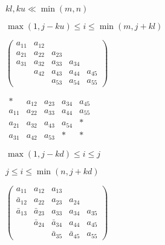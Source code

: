 {\newpage\clearpage
{}%
$kl, ku \ll \min(m,n)$%
\lthtmlinlinemathZ
\lthtmlcheckvsize\clearpage}

{\newpage\clearpage
{}%
$\max(1,j-ku) \leq i \leq \min(m,j+kl)$%
\lthtmlinlinemathZ
\lthtmlcheckvsize\clearpage}

{\newpage\clearpage
{}%
$
\left( \begin{array}{ccccc}
a_{11} & a_{12} &        &        &        \\
a_{21} & a_{22} & a_{23} &        &        \\
a_{31} & a_{32} & a_{33} & a_{34} &        \\
       & a_{42} & a_{43} & a_{44} & a_{45} \\
       &        & a_{53} & a_{54} & a_{55} 
\end{array} \right)
$%
\lthtmlinlinemathZ
\lthtmlcheckvsize\clearpage}

{\newpage\clearpage
{}%
$
\begin{array}{ccccc}
 \ast  & a_{12} & a_{23} & a_{34} & a_{45} \\
a_{11} & a_{22} & a_{33} & a_{44} & a_{55} \\
a_{21} & a_{32} & a_{43} & a_{54} &  \ast  \\
a_{31} & a_{42} & a_{53} &  \ast  &  \ast 
\end{array}
$%
\lthtmlinlinemathZ
\lthtmlcheckvsize\clearpage}

{\newpage\clearpage
{}%
$\max(1,j-kd) \leq i \leq j$%
\lthtmlinlinemathZ
\lthtmlcheckvsize\clearpage}

{\newpage\clearpage
{}%
$j \leq i \leq \min(n,j+kd)$%
\lthtmlinlinemathZ
\lthtmlcheckvsize\clearpage}

{\newpage\clearpage
{}%
$
\left( \begin{array}{ccccc}
a_{11}       & a_{12}       & a_{13}       &              &        \\
\bar{a}_{12} & a_{22}       & a_{23}       & a_{24}       &        \\
\bar{a}_{13} & \bar{a}_{23} & a_{33}       & a_{34}       & a_{35} \\
             & \bar{a}_{24} & \bar{a}_{34} & a_{44}       & a_{45} \\
             &              & \bar{a}_{35} & \bar{a}_{45} & a_{55}
\end{array} \right)
$%
\lthtmlinlinemathZ
\lthtmlcheckvsize\clearpage}

